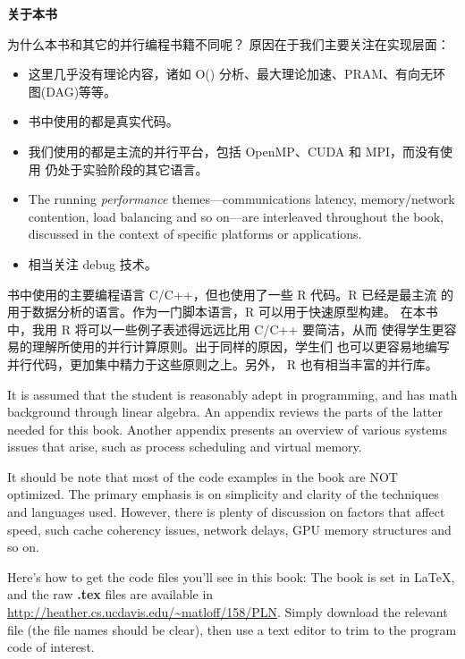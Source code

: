 ﻿\newpage

\begin{center}
{\bf \large 关于本书}
\end{center}

为什么本书和其它的并行编程书籍不同呢？
原因在于我们主要关注在实现层面：

\begin{itemize}

\item 这里几乎没有理论内容，诸如 O() 分析、最大理论加速、PRAM、有向无环图(DAG)等等。

\item 书中使用的都是真实代码。

\item 我们使用的都是主流的并行平台，包括 OpenMP、CUDA 和 MPI，而没有使用
仍处于实验阶段的其它语言。

\item The running {\it performance} themes---communications latency,
memory/network contention, load balancing and so on---are interleaved
throughout the book, discussed in the context of specific platforms or
applications.

\item 相当关注 debug 技术。

\end{itemize}

书中使用的主要编程语言 C/C++，但也使用了一些 R 代码。R 已经是最主流
的用于数据分析的语言。作为一门脚本语言，R 可以用于快速原型构建。
在本书中，我用 R 将可以一些例子表述得远远比用 C/C++ 要简洁，从而
使得学生更容易的理解所使用的并行计算原则。出于同样的原因，学生们
也可以更容易地编写并行代码，更加集中精力于这些原则之上。另外，
R 也有相当丰富的并行库。


It is assumed that the student is reasonably adept in programming, and
has math background through linear algebra.  An appendix reviews the
parts of the latter needed for this book.  Another appendix presents an
overview of various systems issues that arise, such as process
scheduling and virtual memory.

It should be note that most of the code examples in the book are NOT
optimized.  The primary emphasis is on simplicity and clarity of the
techniques and languages used.  However, there is plenty of discussion
on factors that affect speed, such cache coherency issues, network
delays, GPU memory structures and so on.

Here's how to get the code files you'll see in this book: The book is
set in LaTeX, and the raw {\bf .tex} files are available in
\url{http://heather.cs.ucdavis.edu/~matloff/158/PLN}.  Simply download
the relevant file (the file names should be clear), then use a text
editor to trim to the program code of interest.

